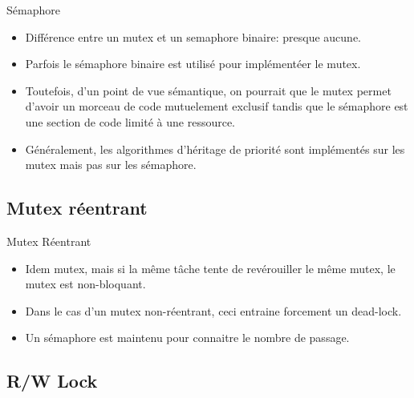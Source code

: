 \begin{frame}{Sémaphore}
  \begin{itemize} 
  \item  Différence entre un  mutex et  un semaphore  binaire: presque
    aucune.
  \item Parfois le sémaphore  binaire est utilisé pour implémentéer le
    mutex.
  \item Toutefois,  d'un point de  vue sémantique, on pourrait  que le
    mutex  permet  d'avoir un  morceau  de  code mutuelement  exclusif
    tandis  que le  sémaphore est  une section  de code  limité  à une
    ressource.
  \item  Généralement,  les algorithmes  d'héritage  de priorité  sont
    implémentés sur les mutex mais pas sur les sémaphore.
  \end{itemize} 
\end{frame} 

\subsection{Mutex réentrant}

\begin{frame}{Mutex Réentrant}
  \begin{itemize} 
  \item Idem  mutex, mais  si la même  tâche tente de  revérouiller le
    même mutex, le mutex est non-bloquant.
  \item Dans le cas  d'un mutex non-réentrant, ceci entraine forcement
    un dead-lock.
  \item Un sémaphore est maintenu pour connaitre le nombre de passage.
  \end{itemize} 
\end{frame} 

\subsection{R/W Lock}

